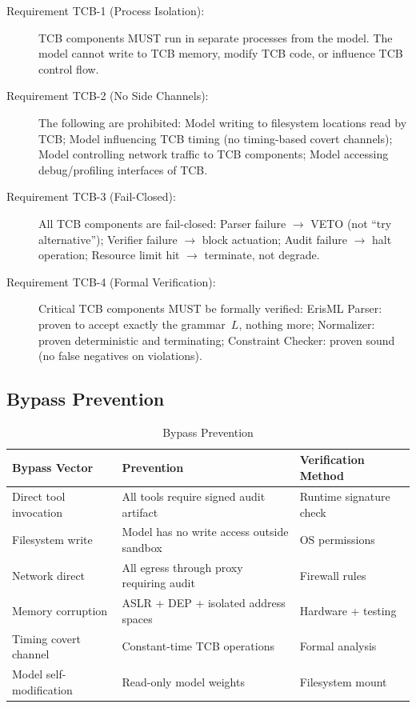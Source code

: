 \documentclass[11pt,letterpaper]{article}
\theoremstyle{definition}
\theoremstyle{remark}
\begin{document}
\begin{description}
\item[Requirement TCB-1 (Process Isolation):] TCB components MUST run in separate processes from the model. The model cannot write to TCB memory, modify TCB code, or influence TCB control flow.

\item[Requirement TCB-2 (No Side Channels):] The following are prohibited: Model writing to filesystem locations read by TCB; Model influencing TCB timing (no timing-based covert channels); Model controlling network traffic to TCB components; Model accessing debug/profiling interfaces of TCB.

\item[Requirement TCB-3 (Fail-Closed):] All TCB components are fail-closed: Parser failure $\to$ VETO (not ``try alternative''); Verifier failure $\to$ block actuation; Audit failure $\to$ halt operation; Resource limit hit $\to$ terminate, not degrade.

\item[Requirement TCB-4 (Formal Verification):] Critical TCB components MUST be formally verified: ErisML Parser: proven to accept exactly the grammar~$L$, nothing more; Normalizer: proven deterministic and terminating; Constraint Checker: proven sound (no false negatives on violations).
\end{description}

\subsection{Bypass Prevention}

\begin{table}[h]
\centering
\small
\begin{tabular}{@{}lll@{}}
\toprule
\textbf{Bypass Vector} & \textbf{Prevention} & \textbf{Verification Method} \\
\midrule
Direct tool invocation & All tools require signed audit artifact & Runtime signature check \\
Filesystem write & Model has no write access outside sandbox & OS permissions \\
Network direct & All egress through proxy requiring audit & Firewall rules \\
Memory corruption & ASLR + DEP + isolated address spaces & Hardware + testing \\
Timing covert channel & Constant-time TCB operations & Formal analysis \\
Model self-modification & Read-only model weights & Filesystem mount \\
\bottomrule
\end{tabular}
\caption{Bypass Prevention}
\end{table}
\end{document}
